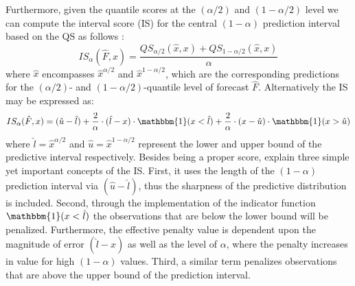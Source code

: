 \documentclass[a4paper,oneside,bibliography=totoc]{scrbook}
\begin{document}
Furthermore, given the quantile scores at the $(\alpha/2)$ and $(1 - \alpha/2)$ level we can compute the interval score (IS) \cite{winkler_decision-theoretic_1972} for the central $(1 - \alpha)$ prediction interval based on the QS as follows \cite{gneiting_strictly_2007, bracher_evaluating_2021}:
\begin{equation}
    IS_\alpha(\hat{F},x)=\frac{QS_{\alpha/2}(\hat{x},x)+QS_{1-\alpha/2}(\hat{x},x)}{\alpha}
    \label{eq:ISQ}
\end{equation}
where $\hat{x}$ encompasses $\hat{x}^{\alpha/2}$ and $\hat{x}^{1-\alpha/2}$, which are the corresponding predictions for the $(\alpha/2)$- and $(1-\alpha/2)$-quantile level of forecast $\hat{F}$.
Alternatively the IS may be expressed as: 
\begin{equation}
    IS_\alpha(\hat{F}, x)=(\hat{u}-\hat{l})+\frac{2}{\alpha}\cdot (\hat{l}-x)\cdot \mathbbm{1}(x<\hat{l})+\frac{2}{\alpha}\cdot (x-\hat{u})\cdot \mathbbm{1}(x>\hat{u})
    \label{eq:IS}
\end{equation}
where $\hat{l}=\hat{x}^{\alpha/2}$ and $\hat{u}=\hat{x}^{1-\alpha/2}$ represent the lower and upper bound of the predictive interval respectively.
Besides being a proper score, \citet{bracher_evaluating_2021} explain three simple yet important concepts of the IS. 
First, it uses the length of the $(1 - \alpha)$ prediction interval via $(\hat{u}-\hat{l})$, thus the sharpness of the predictive distribution is included. 
Second, through the implementation of the indicator function $\mathbbm{1}(x<\hat{l})$ the observations that are below the lower bound will be penalized. 
Furthermore, the effective penalty value is dependent upon the magnitude of error $(\hat{l}-x)$ as well as the level of $\alpha$, where the penalty increases in value for high $(1 - \alpha)$ values. %
Third, a similar term penalizes observations that are above the upper bound of the prediction interval.
\end{document}

